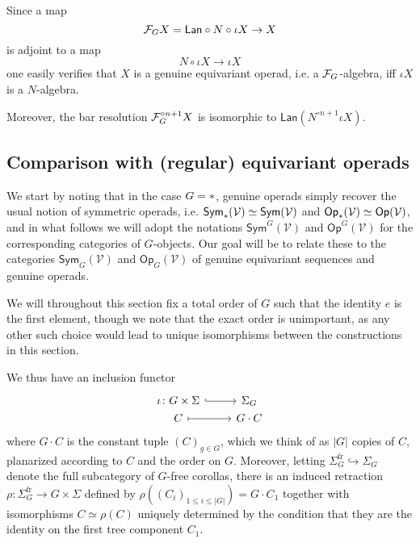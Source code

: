 \documentclass[a4paper,10pt]{article}%
\begin{document}
\begin{remark}\label{REPACKAGERES REM}
Since a map 
\[\mathcal F_G X =\mathsf{Lan} \circ N \circ \iota X \to X\]
is adjoint to a map
\[N \circ \iota X \to \iota X\]
one easily verifies that 
$X$ is a genuine equivariant operad, i.e. 
a $\mathcal F_G$-algebra, iff 
$\iota X$ is a $N$-algebra.

Moreover, the bar resolution
$ \mathcal F_G^{\circ n +1} X $
is isomorphic to
$
	\mathsf{Lan} \left( N^{\circ n +1} \iota X \right)
$.
\end{remark}

\subsection{Comparison with (regular) equivariant operads}
\label{COMPARISON_REGULAR_SECTION}

We start by noting that in the case $G = \**$, genuine operads simply recover the usual notion of symmetric operads, i.e. 
$\mathsf{Sym}_{\**}(\mathcal{V})
\simeq \mathsf{Sym}(\mathcal{V})$
and
$\mathsf{Op}_{\**}(\mathcal{V})
\simeq \mathsf{Op}(\mathcal{V})$, 
and in what follows we will adopt the notations
$\mathsf{Sym}^G(\mathcal{V})$ and
$\mathsf{Op}^G(\mathcal{V})$ 
for the corresponding categories of $G$-objects.
Our goal will be to relate these to the categories
$\mathsf{Sym}_G(\mathcal{V})$ and $\mathsf{Op}_G(\mathcal{V})$
of genuine equivariant sequences and genuine operads.

We will throughout this section fix a total order of $G$ such that the identity $e$ is the first element, though we note that the exact order is unimportant, as any other such choice would lead to unique isomorphisms between the constructions in this section.

We thus have an inclusion functor
\[
\begin{tikzcd}[row sep =0]
	\iota \colon G \times \Sigma \ar[hookrightarrow]{r} &
	\Sigma_G
\\
	C \ar[mapsto]{r} & G \cdot C
\end{tikzcd}
\]
where $G \cdot C$ is the constant tuple $(C)_{g \in G}$,
which we think of as $|G|$ copies of $C$, planarized according to $C$ and the order on $G$.
Moreover, letting $\Sigma_G^{\text{fr}} \hookrightarrow \Sigma_G$ denote the full subcategory of $G$-free corollas, there is an induced retraction 
$\rho \colon \Sigma_{G}^{\text{fr}} \to G \times \Sigma$
defined by 
$\rho\left( (C_i)_{1\leq i \leq |G|} \right) = G \cdot C_1$
together with isomorphisms 
$C \simeq \rho(C)$
uniquely determined by the condition that they
are the identity on the first tree component $C_1$.
\end{document}
